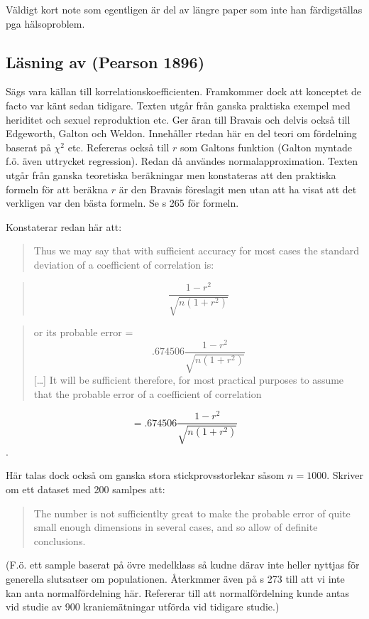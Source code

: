 \documentclass[]{article}
\begin{document}
Väldigt kort note som egentligen är del av längre paper som inte han
färdigställas pga hälsoproblem.

\subsection{Läsning av (Pearson 1896)}\label{lasning-av-pearson1896}

Sägs vara källan till korrelationskoefficienten. Framkommer dock att
konceptet de facto var känt sedan tidigare. Texten utgår från ganska
praktiska exempel med heriditet och sexuel reproduktion etc. Ger äran
till Bravais och delvis också till Edgeworth, Galton och Weldon.
Innehåller rtedan här en del teori om fördelning baserat på \(\chi^2\)
etc. Refereras också till \(r\) som Galtons funktion (Galton myntade
f.ö. även uttrycket regression). Redan då användes normalapproximation.
Texten utgår från ganska teoretiska beräkningar men konstateras att den
praktiska formeln för att beräkna \(r\) är den Bravais föreslagit men
utan att ha visat att det verkligen var den bästa formeln. Se s 265 för
formeln.

Konstaterar redan här att:

\begin{quote}
Thus we may say that with sufficient accuracy for most cases the
standard deviation of a coefficient of correlation is:
\end{quote}

\begin{quote}
\[\frac{1 - r^2}{\sqrt{n(1 + r^2)}}\]
\end{quote}

\begin{quote}
or its probable error = \[.674506 \frac{1- r^2}{\sqrt{n(1 +r^2)}}\]
{[}\ldots{}{]} It will be sufficient therefore, for most practical
purposes to assume that the probable error of a coefficient of
correlation
\end{quote}

\[= .674506 \frac{1 - r^2}{\sqrt{n(1+r^2)}}\].

Här talas dock också om ganska stora stickprovsstorlekar såsom
\(n = 1000\). Skriver om ett dataset med 200 samlpes att:

\begin{quote}
The number is not sufficientlty great to make the probable error of
quite small enough dimensions in several cases, and so allow of definite
conclusions.
\end{quote}

(F.ö. ett sample baserat på övre medelklass så kudne därav inte heller
nyttjas för generella slutsatser om populationen. Återkmmer även på s
273 till att vi inte kan anta normalfördelning här. Refererar till att
normalfördelning kunde antas vid studie av 900 kraniemätningar utförda
vid tidigare studie.)
\end{document}
